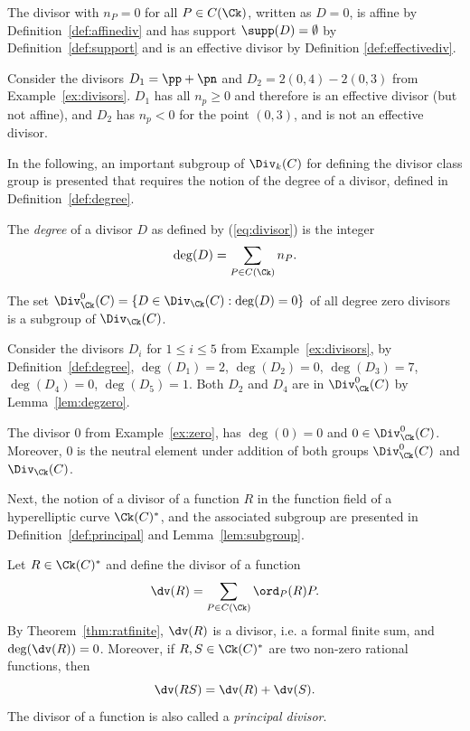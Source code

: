 \be\label{ex:zero} The divisor with $n_P = 0$ for all $P \in C(\Ck)$, written as
$D = 0$, is affine by Definition~\ref{def:affinediv} and has support
$\supp(D)=\emptyset$ by Definition~\ref{def:support} and is an effective divisor
by Definition \ref{def:effectivediv}.
\ee

\be\label{ex:effectivediv} Consider the divisors $D_1 = \pp + \pn$ and $D_2 =
2(0,4) - 2(0,3)$ from Example~\ref{ex:divisors}. $D_1$  has all $n_p \geq 0$ and
therefore is an effective divisor (but not affine), and $D_2$ has $n_p < 0$ for
the point $(0,3)$, and is not an effective divisor.
\ee


In the following, an important subgroup of $\Div_k(C)$ for defining the
divisor class group is presented that requires the notion of the degree of a
divisor, defined in Definition~\ref{def:degree}. 


\bd\label{def:degree}
\cite[Adapted from Definition~7.6.3]{Galbraith_PKC_2012} The \emph{degree} of a
divisor $D$ as defined by (\ref{eq:divisor}) is the integer $$ \deg(D) =
\sum_{P \in C(\Ck)} n_P.$$ 
\ed

\bl\label{lem:degzero}
\cite[Adapted from Lemma~7.6.4]{Galbraith_PKC_2012} The set $\Div^0_{\Ck}(C) =
\{D \in \Div_{\Ck}(C) : \deg(D) = 0 \}$ of all degree zero divisors is a
subgroup of $\Div_{\Ck}(C)$.
\el

\be
Consider the divisors $D_i$ for $ 1\leq i \leq 5$ from Example~\ref{ex:divisors}, by
Definition~\ref{def:degree}, $\deg(D_1) = 2$, $\deg(D_2) = 0$, $\deg(D_3) = 7$,
$\deg(D_4) = 0$, $\deg(D_5) = 1$. Both $D_2$ and $D_4$ are in $\Div^0_{\Ck}(C)$ by
Lemma~\ref{lem:degzero}.
\ee
 
\be\label{ex:affinezero}
The divisor $0$ from Example~\ref{ex:zero}, has $\deg(0) = 0$ and $0
\in \Div^0_{\Ck}(C)$. Moreover, $0$ is the neutral element under addition of both
groups $\Div^0_{\Ck}(C)$ and $\Div_{\Ck}(C)$.
\ee

Next, the notion of a divisor of a function $R$ in the function field of a
hyperelliptic curve $\Ck(C)^*$, and the associated subgroup are presented in
Definition~\ref{def:principal} and Lemma~\ref{lem:subgroup}.


\bd\label{def:principal}
\cite[Adapted from Definition~7.7.2]{Galbraith_PKC_2012} Let $R \in \Ck(C)^*$
and define the divisor of a function  $$ \dv(R) = \sum_{P \in C(\Ck)}
\ord_P(R)P.$$ By Theorem~\ref{thm:ratfinite}, $\dv(R)$ is a divisor, i.e. a
formal finite sum, and $\deg(\dv(R)) = 0$. Moreover, if $R,S \in \Ck(C)^*$ are
two non-zero rational functions, then $$ \dv(RS) = \dv(R) + \dv(S).$$ 
The divisor of a function is also called a \emph{principal divisor}.
\ed

